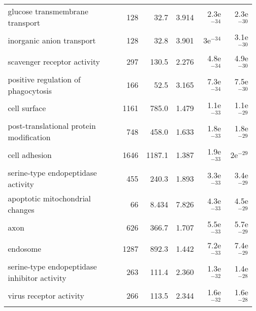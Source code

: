 \begin{longtable}{lrrrrr}
                   glucose transmembrane transport &                     128 &                    32.7 &      3.914 &         2.3e$^{-34}$ &         2.3e$^{-30}$ \\
                         inorganic anion transport &                     128 &                    32.8 &      3.901 &           3e$^{-34}$ &         3.1e$^{-30}$ \\
                       scavenger receptor activity &                     297 &                   130.5 &      2.276 &         4.8e$^{-34}$ &         4.9e$^{-30}$ \\
               positive regulation of phagocytosis &                     166 &                    52.5 &      3.165 &         7.3e$^{-34}$ &         7.5e$^{-30}$ \\
                                      cell surface &                    1161 &                   785.0 &      1.479 &         1.1e$^{-33}$ &         1.1e$^{-29}$ \\
           post-translational protein modification &                     748 &                   458.0 &      1.633 &         1.8e$^{-33}$ &         1.8e$^{-29}$ \\
                                     cell adhesion &                    1646 &                  1187.1 &      1.387 &         1.9e$^{-33}$ &           2e$^{-29}$ \\
                serine-type endopeptidase activity &                     455 &                   240.3 &      1.893 &         3.3e$^{-33}$ &         3.4e$^{-29}$ \\
                   apoptotic mitochondrial changes &                      66 &                   8.434 &      7.826 &         4.3e$^{-33}$ &         4.5e$^{-29}$ \\
                                              axon &                     626 &                   366.7 &      1.707 &         5.5e$^{-33}$ &         5.7e$^{-29}$ \\
                                          endosome &                    1287 &                   892.3 &      1.442 &         7.2e$^{-33}$ &         7.4e$^{-29}$ \\
      serine-type endopeptidase inhibitor activity &                     263 &                   111.4 &      2.360 &         1.3e$^{-32}$ &         1.4e$^{-28}$ \\
                           virus receptor activity &                     266 &                   113.5 &      2.344 &         1.6e$^{-32}$ &         1.6e$^{-28}$ \\

\end{longtable}
